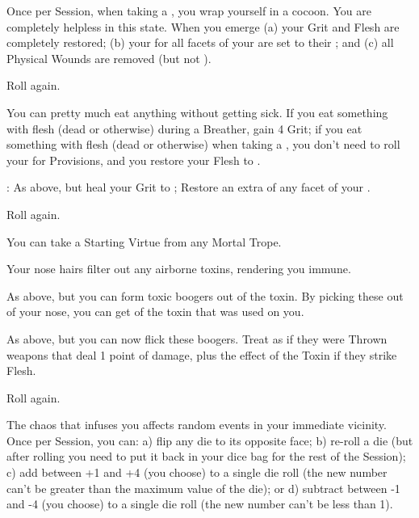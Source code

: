 \begin{multicols*}{2}
 Once per Session, when taking a , you wrap yourself in a cocoon.  You are completely helpless in this state.  When you emerge (a) your Grit and Flesh are completely restored; (b) your \UD for all facets of your  are set to their \MAX; and (c) all Physical Wounds are removed (but not ).

 Roll again.



\NC[Name=Meat on Menu]

 You can pretty much eat anything without getting sick.  If you eat something with flesh (dead or otherwise) during a Breather, gain 4 Grit; if you eat something with flesh (dead or otherwise) when taking a , you don't need to roll your \UD for Provisions, and you restore your Flesh to \MAX.

  : As above, but heal your Grit to \MAX;  Restore an extra \UD of any  facet of your .

  Roll again.

\NC[Name=Me Human!]

 You can take a Starting Virtue from any Mortal Trope.

\NC[Name=Nose Hairs]

  Your nose hairs filter out any airborne toxins, rendering you immune.

  As above, but you can form toxic boogers out of the toxin.  By picking these out of your nose, you can get  of the toxin that was used on you.

  As above, but you can now flick these boogers.  Treat as if they were Thrown weapons that deal 1 point of damage, plus the effect of the Toxin if they strike Flesh.

  Roll again.

\NC[Name=Rando]

 The chaos that infuses you affects random events in your immediate vicinity.  Once per Session, you can:  a) flip any die to its opposite face; b) re-roll a die (but after rolling you need to put it back in your dice bag for the rest of the Session); c) add between +1 and +4 (you choose) to a single die roll (the new number can't be greater than the maximum value of the die); or d) subtract between -1 and -4 (you choose) to a single die roll (the new number can't be less than 1).


\end{multicols*}
